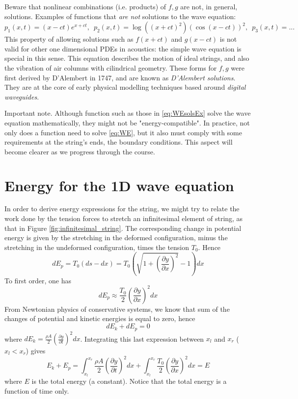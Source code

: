 Beware that nonlinear combinations (i.e. products) of $f,g$ are not, in general, solutions. Examples of functions that \emph{are not} solutions to the wave equation:
\begin{equation}
p_1(x,t) = (x-ct)e^{x+ct}, \,\,\, p_2(x,t) = \log \left( (x+ct)^2 \right)\left(\cos(x-ct)\right)^2, \,\,\, p_3(x,t) = ...
\end{equation}
This property of allowing solutions such as $f(x+ct)$ and $g(x-ct)$ is not valid for other one dimensional PDEs in acoustics: the simple wave equation is special in this sense. This equation describes the motion of ideal strings, and also the vibration of air columns with cilindrical geometry. These forms for $f,g$ were first derived by D'Alembert in 1747, and are known as \emph{D'Alembert solutions}. They are at the core of early physical modelling techniques based around \emph{digital waveguides}.


Important note. Although function such as those in \eqref{eq:WEsolsEx} solve the wave equation mathematically, they might not be "energy-compatible". In practice, not only does a function need to solve \eqref{eq:WE}, but it also must comply with some requirements at the string's ends, the boundary conditions. This aspect will become clearer as we progress through the course.

\section{Energy for the 1D wave equation}


In order to derive energy expressions for the string, we might try to relate the work done by the tension forces to stretch an infinitesimal element of string, as that in Figure \ref{fig:infinitesimal_string}. The corresponding change in potential energy is given by the stretching in the deformed configuration, minus the stretching in the undeformed configuration, times the tension $T_0$. Hence
\begin{equation}
dE_p =  T_0 (ds-dx) =  T_0  \left(\sqrt{1 + \left( \frac{\partial y}{\partial x}\right)^2} - 1 \right)dx
\end{equation}
To first order, one has
\begin{equation}
dE_p \approx \frac{T_0}{2}\left(\frac{\partial y}{\partial x}\right)^2 dx
\end{equation}
From Newtonian physics of conservative systems, we know that sum of the changes of potential and kinetic energies is equal to zero, hence
\begin{equation}
dE_k + dE_p = 0 
\end{equation}
where $dE_k = \frac{\rho A}{2} \left( \frac{\partial y}{\partial t} \right)^2 dx$. Integrating this last expression between $x_l $ and $x_r$ ($x_l<x_r$) gives
\begin{equation}\label{eq:EnBal}
E_k + E_p = \int_{x_l}^{x_r} \frac{\rho A}{2} \left(\frac{\partial y}{\partial t}\right)^2 dx + \int_{x_l}^{x_r} \frac{T_0}{2} \left(\frac{\partial y}{\partial x}\right)^2 dx = E
\end{equation}
where $E$ is the total energy (a constant). Notice that the total energy is a function of time only. 



